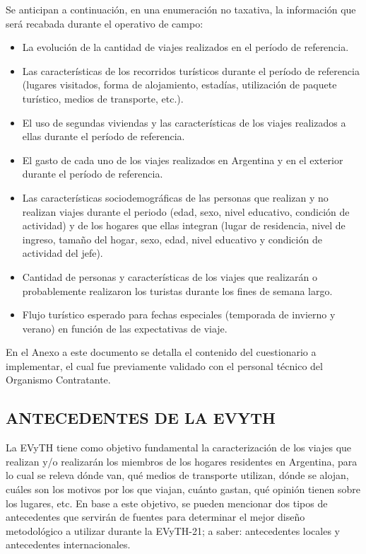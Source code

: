 \documentclass[
  openany]{book}
\begin{document}
Se anticipan a continuación, en una enumeración no taxativa, la
información que será recabada durante el operativo de campo:

\begin{itemize}
\item
  La evolución de la cantidad de viajes realizados en el período de
  referencia.
\item
  Las características de los recorridos turísticos durante el período
  de referencia (lugares visitados, forma de alojamiento, estadías,
  utilización de paquete turístico, medios de transporte, etc.).
\item
  El uso de segundas viviendas y las características de los viajes
  realizados a ellas durante el período de referencia.
\item
  El gasto de cada uno de los viajes realizados en Argentina y en el
  exterior durante el período de referencia.
\item
  Las características sociodemográficas de las personas que realizan y
  no realizan viajes durante el periodo (edad, sexo, nivel educativo,
  condición de actividad) y de los hogares que ellas integran (lugar
  de residencia, nivel de ingreso, tamaño del hogar, sexo, edad, nivel
  educativo y condición de actividad del jefe).
\item
  Cantidad de personas y características de los viajes que realizarán
  o probablemente realizaron los turistas durante los fines de semana
  largo.
\item
  Flujo turístico esperado para fechas especiales (temporada de
  invierno y verano) en función de las expectativas de viaje.
\end{itemize}

En el Anexo a este documento se detalla el contenido del cuestionario a
implementar, el cual fue previamente validado con el personal técnico
del Organismo Contratante.

\hypertarget{antecedentes-de-la-evyth}{%
\subsection{\texorpdfstring{\textbf{ANTECEDENTES DE LA EVYTH}}{ANTECEDENTES DE LA EVYTH}}\label{antecedentes-de-la-evyth}}

La EVyTH tiene como objetivo fundamental la caracterización de los
viajes que realizan y/o realizarán los miembros de los hogares
residentes en Argentina, para lo cual se releva dónde van, qué medios de
transporte utilizan, dónde se alojan, cuáles son los motivos por los que
viajan, cuánto gastan, qué opinión tienen sobre los lugares, etc. En
base a este objetivo, se pueden mencionar dos tipos de antecedentes que
servirán de fuentes para determinar el mejor diseño metodológico a
utilizar durante la EVyTH-21; a saber: antecedentes locales y
antecedentes internacionales.
\end{document}
